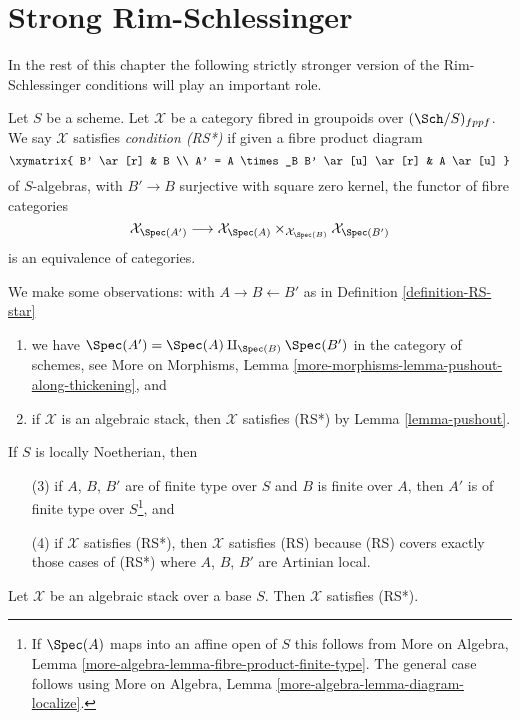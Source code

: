 \section{Strong Rim-Schlessinger}
\label{section-RS-star}

\noindent
In the rest of this chapter the following strictly stronger version
of the Rim-Schlessinger conditions will play an important role.

\begin{definition}
\label{definition-RS-star}
Let $S$ be a scheme. Let $\mathcal{X}$ be a category
fibred in groupoids over $(\Sch/S)_{fppf}$. We say $\mathcal{X}$
satisfies {\it condition (RS*)} if given a fibre product diagram
$$
\xymatrix{
B' \ar[r] & B \\
A' = A \times_B B' \ar[u] \ar[r] & A \ar[u]
}
$$
of $S$-algebras, with $B' \to B$ surjective with square zero kernel,
the functor of fibre categories
$$
\mathcal{X}_{\Spec(A')}
\longrightarrow
\mathcal{X}_{\Spec(A)} \times_{\mathcal{X}_{\Spec(B)}} \mathcal{X}_{\Spec(B')}
$$
is an equivalence of categories.
\end{definition}

\noindent
We make some observations:
with $A \to B \leftarrow B'$ as in Definition \ref{definition-RS-star}
\begin{enumerate}
\item we have $\Spec(A') = \Spec(A) \amalg_{\Spec(B)} \Spec(B')$
in the category of schemes, see
More on Morphisms, Lemma \ref{more-morphisms-lemma-pushout-along-thickening},
and
\item if $\mathcal{X}$ is an algebraic stack, then $\mathcal{X}$ satisfies
(RS*) by Lemma \ref{lemma-pushout}.
\end{enumerate}
If $S$ is locally Noetherian, then
\begin{enumerate}
\item[(3)] if $A$, $B$, $B'$ are of finite type over $S$ and
$B$ is finite over $A$, then $A'$ is of finite type over
$S$\footnote{If $\Spec(A)$ maps into an affine open of $S$
this follows from
More on Algebra, Lemma \ref{more-algebra-lemma-fibre-product-finite-type}.
The general case follows using
More on Algebra, Lemma \ref{more-algebra-lemma-diagram-localize}.}, and
\item[(4)] if $\mathcal{X}$ satisfies (RS*), then $\mathcal{X}$ satisfies (RS)
because (RS) covers exactly those cases of (RS*) where
$A$, $B$, $B'$ are Artinian local.
\end{enumerate}

\begin{lemma}
\label{lemma-algebraic-stack-RS-star}
Let $\mathcal{X}$ be an algebraic stack over a base $S$.
Then $\mathcal{X}$ satisfies (RS*).
\end{lemma}

